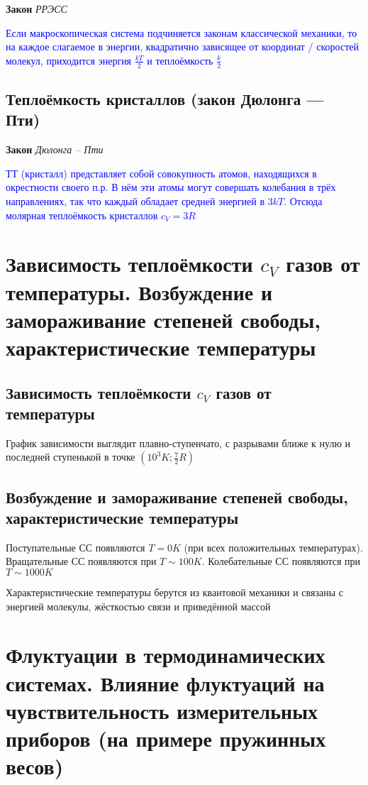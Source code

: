 \documentclass[a4paper, 14pt]{article}
\begin{document}
    \textbf{Закон} \textit{РРЭСС}
    
    \textcolor{blue}{Если макроскопическая система подчиняется законам классической механики, то на каждое слагаемое
    в энергии, квадратично зависящее от координат / скоростей молекул, приходится энергия $\frac{kT}{2}$ и
    теплоёмкость $\frac{k}{2}$}
    
    \subsection{Теплоёмкость кристаллов (закон Дюлонга — Пти)}
    
    \textbf{Закон} \textit{Дюлонга -- Пти}
    
    \textcolor{blue}{ТТ (кристалл) представляет собой совокупность атомов, находящихся в окрестности своего п.р.
    В нём эти атомы могут совершать колебания в трёх направлениях, так что каждый обладает средней энергией в $3kT$.
    Отсюда молярная теплоёмкость кристаллов $c_V = 3R$}
    
    \section{Зависимость теплоёмкости $c_V$ газов от температуры.
    Возбуждение и замораживание степеней свободы, характеристические температуры}
    
    \subsection{Зависимость теплоёмкости $c_V$ газов от температуры}
    
    График зависимости выглядит плавно-ступенчато, с разрывами ближе к нулю и последней ступенькой в точке
    $(10^3 K; \frac{7}{2}R)$
    
    \subsection{Возбуждение и замораживание степеней свободы, характеристические температуры}
    
    Поступательные СС появляются $T = 0 K$ (при всех положительных температурах).
    Вращательные СС появляются при $T \sim 100 K$.
    Колебательные СС появляются при $T \sim 1000 K$
    
    Характеристические температуры берутся из квантовой механики и связаны с энергией молекулы, жёсткостью связи и
    приведённой массой
    
    \section{Флуктуации в термодинамических системах.
    Влияние флуктуаций на чувствительность измерительных приборов (на примере пружинных весов)}
    
\end{document}
